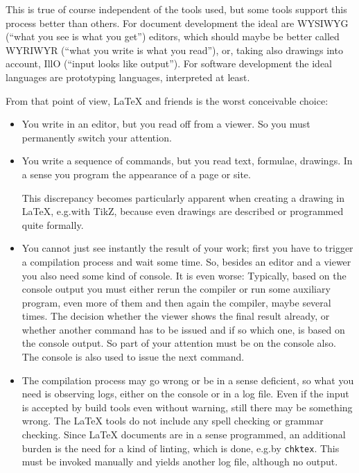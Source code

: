 This is true of course independent of the tools used, 
but some tools support this process better than others. 
For document development the ideal are WYSIWYG (``what you see is what you get'') editors, 
which should maybe be better called WYRIWYR (``what you write is what you read''), 
or, taking also drawings into account, IllO (``input looks like output''). %
For software development the ideal languages are prototyping languages, interpreted at least. 

From that point of view, \LaTeX{} and friends is the worst conceivable choice: 
%
\begin{itemize}
  \item
  You write in an editor, but you read off from a viewer. 
  So you must permanently switch your attention. 
  \item
  You write a sequence of commands, but you read text, formulae, drawings. 
  In a sense you program the appearance of a page or site. 

  This discrepancy becomes particularly apparent when creating a drawing in \LaTeX, 
  e.g.\@ with TikZ, because even drawings are described or programmed quite formally. 
  \item
  You cannot just see instantly the result of your work; 
  first you have to trigger a compilation process and wait some time. 
  So, besides an editor and a viewer you also need some kind of console. 
  It is even worse: 
  Typically, based on the console output you must either rerun the compiler 
  or run some auxiliary program, even more of them 
  and then again the compiler, maybe several times. 
  The decision whether the viewer shows the final result already, 
  or whether another command has to be issued and if so which one, 
  is based on the console output. 
  So part of your attention must be on the console also. 
  The console is also used to issue the next command. 
  \item 
  The compilation process may go wrong or be in a sense deficient, 
  so what you need is observing logs, either on the console or in a log file. 
  Even if the input is accepted by build tools even without warning, 
  still there may be something wrong. 
  The \LaTeX{} tools do not include any spell checking or grammar checking. 
  Since \LaTeX{} documents are in a sense programmed, 
  an additional burden is the need for a kind of linting, 
  which is done, e.g.\@ by \texttt{chktex}. 
  This must be invoked manually and yields another log file, 
  although no output. 
\end{itemize}

